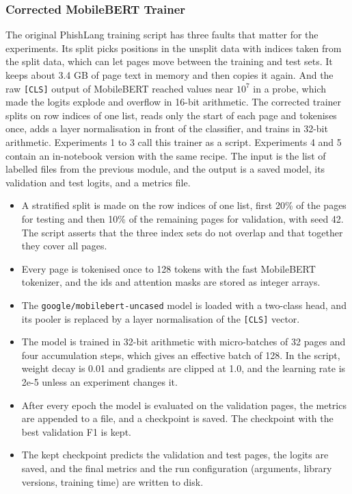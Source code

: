 \documentclass{FastFyp}
\begin{document}
\subsubsection{Corrected MobileBERT Trainer}
\label{sec:impl-trainer}
The original PhishLang training script has three faults that matter for the experiments. Its split picks positions in the unsplit data with indices taken from the split data, which can let pages move between the training and test sets. It keeps about 3.4 GB of page text in memory and then copies it again. And the raw \texttt{[CLS]} output of MobileBERT reached values near $10^{7}$ in a probe, which made the logits explode and overflow in 16-bit arithmetic. The corrected trainer splits on row indices of one list, reads only the start of each page and tokenises once, adds a layer normalisation in front of the classifier, and trains in 32-bit arithmetic. Experiments 1 to 3 call this trainer as a script. Experiments 4 and 5 contain an in-notebook version with the same recipe. The input is the list of labelled files from the previous module, and the output is a saved model, its validation and test logits, and a metrics file.
\begin{itemize}
	\item A stratified split is made on the row indices of one list, first 20\% of the pages for testing and then 10\% of the remaining pages for validation, with seed 42. The script asserts that the three index sets do not overlap and that together they cover all pages.
	\item Every page is tokenised once to 128 tokens with the fast MobileBERT tokenizer, and the ids and attention masks are stored as integer arrays.
	\item The \texttt{google/\allowbreak mobilebert-uncased} model is loaded with a two-class head, and its pooler is replaced by a layer normalisation of the \texttt{[CLS]} vector.
	\item The model is trained in 32-bit arithmetic with micro-batches of 32 pages and four accumulation steps, which gives an effective batch of 128. In the script, weight decay is 0.01 and gradients are clipped at 1.0, and the learning rate is 2e-5 unless an experiment changes it.
	\item After every epoch the model is evaluated on the validation pages, the metrics are appended to a file, and a checkpoint is saved. The checkpoint with the best validation F1 is kept.
	\item The kept checkpoint predicts the validation and test pages, the logits are saved, and the final metrics and the run configuration (arguments, library versions, training time) are written to disk.
\end{itemize}
\end{document}
